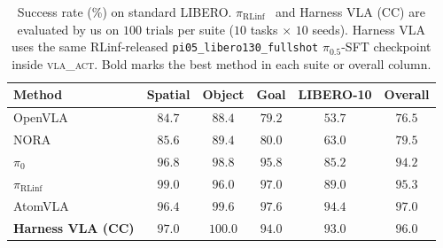 \documentclass[11pt]{article}
\newcommand{\piRLinf}{\pi_{\mathrm{RLinf}}}
\begin{document}
\begin{table}[htbp]
\centering
\caption{Success rate (\%) on standard LIBERO. $\piRLinf$~\citep{yu2025rlinf} and Harness VLA (CC) are evaluated by us on $100$ trials per suite ($10$ tasks $\times$ $10$ seeds). Harness VLA uses the same RLinf-released \texttt{pi05\_libero130\_fullshot} $\pi_{0.5}$-SFT checkpoint inside \textsc{vla\_act}. Bold marks the best method in each suite or overall column.}
\label{tab:libero_main}
\small
\setlength{\tabcolsep}{5pt}
\begin{tabular}{lccccc}
\toprule
Method                                   & Spatial      & Object        & Goal         & LIBERO-10    & \textbf{Overall} \\
\midrule
OpenVLA~\citep{kim2024openvla}           & $84.7$       & $88.4$        & $79.2$       & $53.7$       & $76.5$ \\
NORA~\citep{hung2025nora}                & $85.6$       & $89.4$        & $80.0$       & $63.0$       & $79.5$ \\
$\pi_0$~\citep{black2025pi0}             & $96.8$       & $98.8$        & $95.8$       & $85.2$       & $94.2$ \\
$\piRLinf$                               & $\mathbf{99.0}$ & $96.0$     & $97.0$       & $89.0$       & $95.3$ \\
AtomVLA~\citep{sun2026atomvla}           & $96.4$       & $99.6$        & $\mathbf{97.6}$ & $94.4$    & $\mathbf{97.0}$ \\
\textbf{Harness VLA (CC)}           & $97.0$       & $\mathbf{100.0}$ & $94.0$    & $93.0$       & $96.0$ \\
\bottomrule
\end{tabular}
\end{table}
\end{document}
